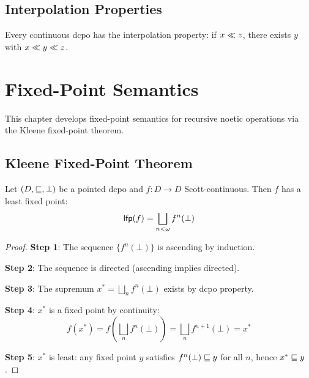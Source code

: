 \section{Interpolation Properties}

\begin{theorem}
\label{thm:continuous-interpolation}
Every continuous dcpo has the interpolation property: if $x \ll z$,
there exists $y$ with $x \ll y \ll z$.
\end{theorem}


\chapter{Fixed-Point Semantics}
\label{ch:fixed-point-semantics}

\begin{tcolorbox}[colback=blue!5!white,colframe=blue!75!black,title=\vnewfour]
This chapter develops fixed-point semantics for recursive noetic operations
via the Kleene fixed-point theorem.
\end{tcolorbox}

\section{Kleene Fixed-Point Theorem}

\begin{theorem}
\label{thm:kleene-fixpoint}
Let $(D, \sqsubseteq, \bot)$ be a pointed dcpo and $f : D \to D$ Scott-continuous.
Then $f$ has a least fixed point:
\[
\mathsf{lfp}(f) = \bigsqcup_{n < \omega} f^n(\bot)
\]
\end{theorem}

\begin{proof}
\textbf{Step 1}: The sequence $\{f^n(\bot)\}$ is ascending by induction.

\textbf{Step 2}: The sequence is directed (ascending implies directed).

\textbf{Step 3}: The supremum $x^* = \bigsqcup_n f^n(\bot)$ exists by dcpo property.

\textbf{Step 4}: $x^*$ is a fixed point by continuity:
\[
f(x^*) = f\left(\bigsqcup_n f^n(\bot)\right) = \bigsqcup_n f^{n+1}(\bot) = x^*
\]

\textbf{Step 5}: $x^*$ is least: any fixed point $y$ satisfies $f^n(\bot) \sqsubseteq y$
for all $n$, hence $x^* \sqsubseteq y$.
\end{proof}

